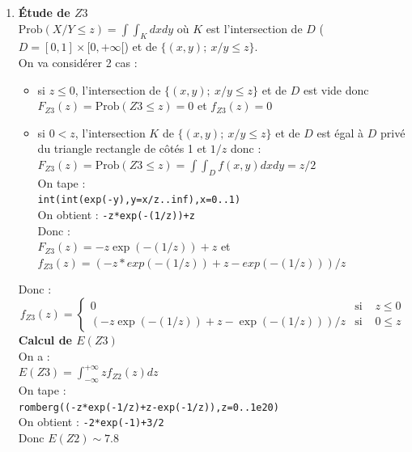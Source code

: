 \documentclass[a4paper,11pt]{book}
\begin{document}
\begin{enumerate}
\begin{enumerate}
\item {\bf \'Etude de $Z3$}\\
$\mbox{Prob}(X/Y\leq z)=\int\int_Kdxdy$ o\`u $K$ est l'intersection de 
$D$ ($D=[0,1]\times [0,+\infty[$) et de $\{(x,y);\  x/y\leq z\}$.\\
On va consid\'erer 2 cas :
\begin{itemize}
\item si $z\leq 0$, l'intersection de $\{(x,y);\   x/y\leq z\}$ et de
 $D$ est vide donc
 $F_{Z3}(z)=\mbox{Prob}(Z3\leq z)=0$ et $f_{Z3}(z)=0$
\item si $0<z$, l'intersection $K$ de $\{(x,y);\   x/y\leq z\}$ et de $D$ est 
\'egal \`a $D$ priv\'e du triangle rectangle de c\^ot\'es 1 et $1/z$ donc :\\
$F_{Z3}(z)=\mbox{Prob}(Z3\leq z)=\int\int_Df(x,y)dxdy=z/2$\\
On tape :\\
{\tt int(int(exp(-y),y=x/z..inf),x=0..1)}\\
On obtient : {\tt -z*exp(-(1/z))+z}\\
Donc :\\
 $F_{Z3}(z)=-z\exp(-(1/z))+z$ et $f_{Z3}(z)=(-z*exp(-(1/z))+z-exp(-(1/z)))/z$
\end{itemize}
Donc :
$$
f_{Z3}(z)=
\left\{
\begin{array}{rll}
0 & \mbox{si }& z \leq 0\\
(-z\exp(-(1/z))+z-\exp(-(1/z)))/z & \mbox{si }& 0 \leq z 
\end{array}
\right.
$$
{\bf Calcul de $E(Z3)$}\\
On a :\\
$\displaystyle E(Z3)=\int_{-\infty}^{+\infty}zf_{Z2}(z)dz$\\
On tape :\\
{\tt romberg((-z*exp(-1/z)+z-exp(-1/z)),z=0..1e20)}\\
On obtient : {\tt -2*exp(-1)+3/2}\\
Donc $E(Z2)\sim 7.8$


\end{enumerate}
\end{enumerate}
\end{document}
